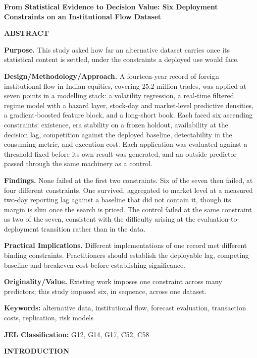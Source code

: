 \documentclass[12pt,a4paper]{article}
\newcommand{\mainhead}[1]{%
  \par\vspace{10pt}\noindent\textbf{\MakeUppercase{#1}}\par\vspace{2pt}}
\begin{document}
\begin{center}\textbf{\large From Statistical Evidence to Decision Value: Six Deployment Constraints on an Institutional Flow Dataset}\end{center}

\mainhead{ABSTRACT}

\textbf{Purpose.} This study asked how far an alternative dataset carries once its statistical content is settled, under the constraints a deployed use would face.

\textbf{Design/Methodology/Approach.} A fourteen-year record of foreign institutional flow in Indian equities, covering 25.2 million trades, was applied at seven points in a modelling stack: a volatility regression, a real-time filtered regime model with a hazard layer, stock-day and market-level predictive densities, a gradient-boosted feature block, and a long-short book. Each faced six ascending constraints: existence, era stability on a frozen holdout, availability at the decision lag, competition against the deployed baseline, detectability in the consuming metric, and execution cost. Each application was evaluated against a threshold fixed before its own result was generated, and an outside predictor passed through the same machinery as a control.

\textbf{Findings.} None failed at the first two constraints. Six of the seven then failed, at four different constraints. One survived, aggregated to market level at a measured two-day reporting lag against a baseline that did not contain it, though its margin is slim once the search is priced. The control failed at the same constraint as two of the seven, consistent with the difficulty arising at the evaluation-to-deployment transition rather than in the data.

\textbf{Practical Implications.} Different implementations of one record met different binding constraints. Practitioners should establish the deployable lag, competing baseline and breakeven cost before establishing significance.

\textbf{Originality/Value.} Existing work imposes one constraint across many predictors; this study imposed six, in sequence, across one dataset.

\textbf{Keywords:} alternative data, institutional flow, forecast evaluation, transaction costs, replication, risk models

\textbf{JEL Classification:} G12, G14, G17, C52, C58

\mainhead{INTRODUCTION}
\end{document}
